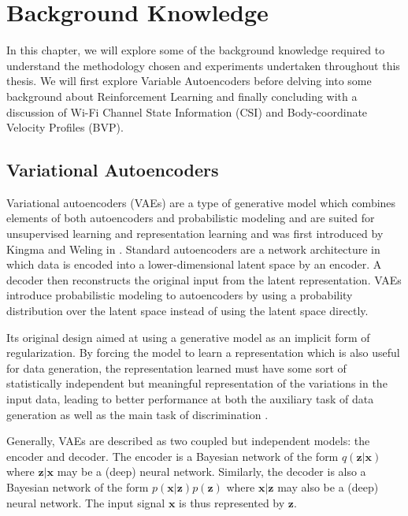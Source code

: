 \chapter{Background Knowledge}\label{chapter:background-knowledge}

In this chapter, we will explore some of the background knowledge required to understand the methodology chosen and experiments undertaken throughout this thesis.
We will first explore Variable Autoencoders before delving into some background about Reinforcement Learning and finally concluding with a discussion of Wi-Fi Channel State Information (CSI) and Body-coordinate Velocity Profiles (BVP).

\section{Variational Autoencoders}

Variational autoencoders (VAEs) are a type of generative model which combines elements of both autoencoders and probabilistic modeling and are suited for unsupervised learning and representation learning and was first introduced by Kingma and Weling in \cite{kingma2013auto}.
Standard autoencoders are a network architecture in which data is encoded into a lower-dimensional latent space by an encoder.
A decoder then reconstructs the original input from the latent representation.
VAEs introduce probabilistic modeling to autoencoders by using a probability distribution over the latent space instead of using the latent space directly.

Its original design aimed at using a generative model as an implicit form of regularization.
By forcing the model to learn a representation which is also useful for data generation, the representation learned must have some sort of statistically independent but meaningful representation of the variations in the input data, leading to better performance at both the auxiliary task of data generation as well as the main task of discrimination \cite{kingma2019introduction}.

Generally, VAEs are described as two coupled but independent models: the encoder and decoder.
The encoder is a Bayesian network of the form $q(\boldsymbol{z} | \boldsymbol{x})$ where $\boldsymbol{z}|\boldsymbol{x}$ may be a (deep) neural network.
Similarly, the decoder is also a Bayesian network of the form $p(\boldsymbol{x}|\boldsymbol{z}) p(\boldsymbol{z})$ where $\boldsymbol{x}|\boldsymbol{z}$ may also be a (deep) neural network.
The input signal $\boldsymbol{x}$ is thus represented by $\boldsymbol{z}$.

